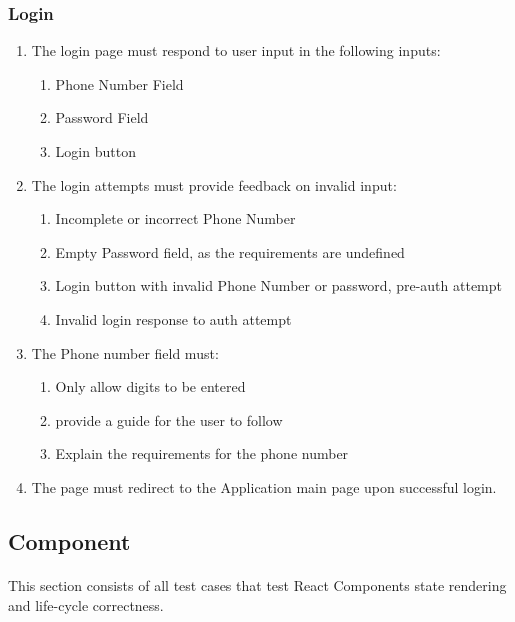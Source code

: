 \documentclass[12pt]{article}
\begin{document}
\subsubsection{Login}
\begin{enumerate}	
	\item The login page must respond to user input in the following inputs:
	\begin{enumerate}
		\singlespacing
		\item Phone Number Field
		\item Password Field
		\item Login button
	\end{enumerate}
	\item The login attempts must provide feedback on invalid input:
	\begin{enumerate}
		\singlespacing
		\item Incomplete or incorrect Phone Number
		\item Empty Password field, as the requirements are undefined
		\item Login button with invalid Phone Number or password, pre-auth attempt
		\item Invalid login response to auth attempt
	\end{enumerate}
		\item The Phone number field must:
	\begin{enumerate}
		\singlespacing
		\item Only allow digits to be entered
		\item provide a guide for the user to follow
		\item Explain the requirements for the phone number
	\end{enumerate}
	\item The page must redirect to the Application main page upon successful login.
\end{enumerate}	
\newpage
\subsection{Component}
\paragraph{}	This section consists of all test cases that test React Components state rendering and life-cycle correctness.
\end{document}
